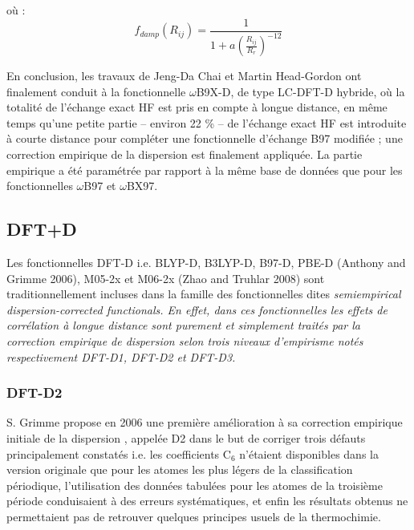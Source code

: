 	\noindent où :
	\begin{equation}
	f_{damp} (R_{ij})=\frac{1}{1+a(\frac{R_{ij}}{R_{r}})^{-12}}
	\end{equation}
	
	En conclusion, les travaux de Jeng-Da Chai et Martin Head-Gordon ont finalement conduit à la fonctionnelle $\omega$B9X-D, de type LC-DFT-D hybride, où la totalité de l'échange exact HF est pris en compte à longue distance, en même temps qu'une petite partie -- environ 22 \% -- de l'échange exact HF est introduite à courte distance pour compléter une fonctionnelle d'échange B97 modifiée ; une correction empirique de la dispersion est finalement appliquée. La partie empirique a été paramétrée par rapport à la même base de données que pour les fonctionnelles $\omega$B97 et $\omega$BX97.
	
	\subsection{DFT+D}
	
	Les fonctionnelles DFT-D i.e. BLYP-D, B3LYP-D, B97-D, PBE-D (Anthony and Grimme 2006), M05-2x et M06-2x (Zhao and Truhlar 2008) sont traditionnellement incluses dans la famille des fonctionnelles dites \it{semiempirical dispersion-corrected functionals}. En effet, dans ces fonctionnelles les effets de corrélation à longue distance sont purement et simplement traités par la correction empirique de dispersion selon trois niveaux d’empirisme notés respectivement DFT-D1, DFT-D2 et DFT-D3. 
	
	\subsubsection{DFT-D2}
	
	S. Grimme \cite{grimme2006semiempirical} propose en 2006 une première amélioration à sa correction empirique initiale de la dispersion \cite{grimme2004accurate}, appelée D2 dans le but de corriger trois défauts principalement constatés i.e. les coefficients C$_{6}$ n’étaient disponibles dans la version originale que pour les atomes les plus légers de la classification périodique, l’utilisation des données tabulées pour les atomes de la troisième période conduisaient à des erreurs systématiques, et enfin les résultats obtenus ne permettaient pas de retrouver quelques principes usuels de la thermochimie.  
	
